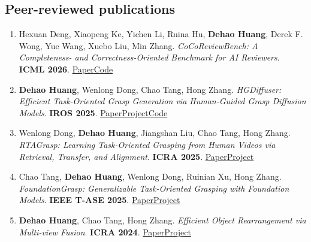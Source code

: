 \subsection*{Peer-reviewed publications}
\begin{enumerate}[label={\arabic*.},leftmargin=1.4em,itemsep=5pt,parsep=0pt,topsep=3pt]
\item \begin{minipage}[t]{\linewidth}Hexuan Deng, Xiaopeng Ke, Yichen Li, Ruina Hu, \textbf{Dehao Huang}, Derek F. Wong, Yue Wang, Xuebo Liu, Min Zhang. \emph{CoCoReviewBench: A Completeness- and Correctness-Oriented Benchmark for AI Reviewers}. \textbf{ICML 2026}. {\small \href{https://arxiv.org/abs/2605.07905}{Paper}\enspace \href{https://github.com/hexuandeng/CoCoReviewBench}{Code}}\end{minipage}
\item \begin{minipage}[t]{\linewidth}\textbf{Dehao Huang}, Wenlong Dong, Chao Tang, Hong Zhang. \emph{HGDiffuser: Efficient Task-Oriented Grasp Generation via Human-Guided Grasp Diffusion Models}. \textbf{IROS 2025}. {\small \href{https://arxiv.org/abs/2503.00508}{Paper}\enspace \href{https://sites.google.com/view/hgdiffuser}{Project}\enspace \href{https://github.com/red0orange/handgrasp_ws}{Code}}\end{minipage}
\item \begin{minipage}[t]{\linewidth}Wenlong Dong, \textbf{Dehao Huang}, Jiangshan Liu, Chao Tang, Hong Zhang. \emph{RTAGrasp: Learning Task-Oriented Grasping from Human Videos via Retrieval, Transfer, and Alignment}. \textbf{ICRA 2025}. {\small \href{https://arxiv.org/abs/2409.16033}{Paper}\enspace \href{https://sites.google.com/view/rtagrasp/home}{Project}}\end{minipage}
\item \begin{minipage}[t]{\linewidth}Chao Tang, \textbf{Dehao Huang}, Wenlong Dong, Ruinian Xu, Hong Zhang. \emph{FoundationGrasp: Generalizable Task-Oriented Grasping with Foundation Models}. \textbf{IEEE T-ASE 2025}. {\small \href{https://arxiv.org/abs/2404.10399}{Paper}\enspace \href{https://sites.google.com/view/foundationgrasp/}{Project}}\end{minipage}
\item \begin{minipage}[t]{\linewidth}\textbf{Dehao Huang}, Chao Tang, Hong Zhang. \emph{Efficient Object Rearrangement via Multi-view Fusion}. \textbf{ICRA 2024}. {\small \href{https://arxiv.org/abs/2309.08994}{Paper}\enspace \href{https://sites.google.com/view/multi-view-rearr}{Project}}\end{minipage}

\end{enumerate}
